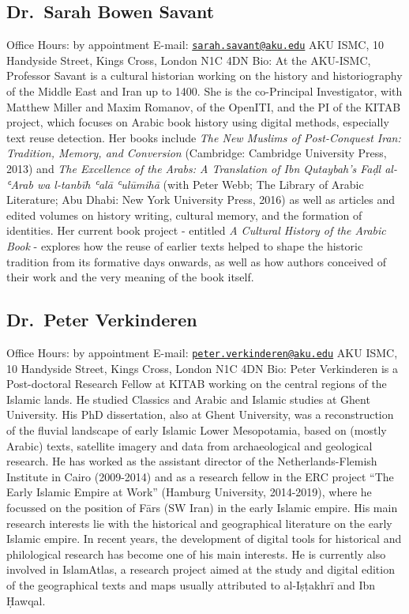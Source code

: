 \documentclass[
]{book}
\begin{document}
\hypertarget{dr.-sarah-bowen-savant}{%
\subsection{Dr.~Sarah Bowen Savant}\label{dr.-sarah-bowen-savant}}

Office Hours: by appointment
E-mail: \href{mailto:sarah.savant@aku.edu}{\nolinkurl{sarah.savant@aku.edu}}
AKU ISMC, 10 Handyside Street, Kings Cross, London N1C 4DN
Bio: At the AKU-ISMC, Professor Savant is a cultural historian working on the history and historiography of the Middle East and Iran up to 1400. She is the co-Principal Investigator, with Matthew Miller and Maxim Romanov, of the OpenITI, and the PI of the KITAB project, which focuses on Arabic book history using digital methods, especially text reuse detection. Her books include \emph{The New Muslims of Post-Conquest Iran: Tradition, Memory, and Conversion} (Cambridge: Cambridge University Press, 2013) and \emph{The Excellence of the Arabs: A Translation of Ibn Qutaybah's Faḍl al-ʿArab wa l-tanbīh ʿalā ʿulūmihā} (with Peter Webb; The Library of Arabic Literature; Abu Dhabi: New York University Press, 2016) as well as articles and edited volumes on history writing, cultural memory, and the formation of identities. Her current book project - entitled \emph{A Cultural History of the Arabic Book} - explores how the reuse of earlier texts helped to shape the historic tradition from its formative days onwards, as well as how authors conceived of their work and the very meaning of the book itself.

\hypertarget{dr.-peter-verkinderen}{%
\subsection{Dr.~Peter Verkinderen}\label{dr.-peter-verkinderen}}

Office Hours: by appointment
E-mail: \href{mailto:peter.verkinderen@aku.edu}{\nolinkurl{peter.verkinderen@aku.edu}}
AKU ISMC, 10 Handyside Street, Kings Cross, London N1C 4DN
Bio: Peter Verkinderen is a Post-doctoral Research Fellow at KITAB working on the central regions of the Islamic lands. He studied Classics and Arabic and Islamic studies at Ghent University. His PhD dissertation, also at Ghent University, was a reconstruction of the fluvial landscape of early Islamic Lower Mesopotamia, based on (mostly Arabic) texts, satellite imagery and data from archaeological and geological research. He has worked as the assistant director of the Netherlands-Flemish Institute in Cairo (2009-2014) and as a research fellow in the ERC project ``The Early Islamic Empire at Work'' (Hamburg University, 2014-2019), where he focussed on the position of Fārs (SW Iran) in the early Islamic empire. His main research interests lie with the historical and geographical literature on the early Islamic empire. In recent years, the development of digital tools for historical and philological research has become one of his main interests. He is currently also involved in IslamAtlas, a research project aimed at the study and digital edition of the geographical texts and maps usually attributed to al-Iṣṭakhrī and Ibn Ḥawqal.
\end{document}
